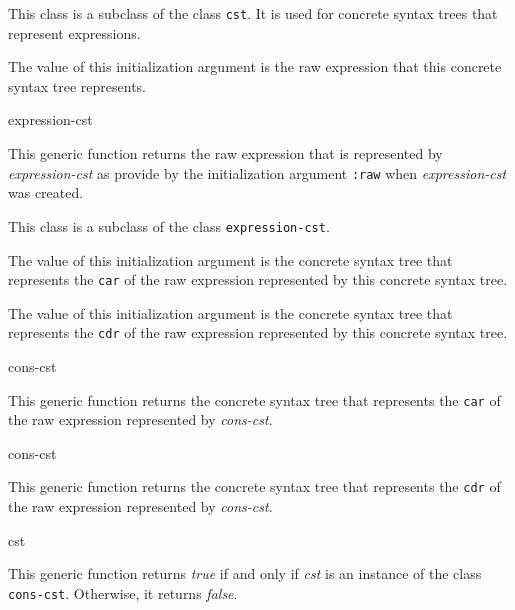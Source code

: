 This class is a subclass of the class \texttt{cst}.  It is used for
concrete syntax trees that represent \commonlisp{} expressions.


The value of this initialization argument is the raw \commonlisp{}
expression that this concrete syntax tree represents.

 {expression-cst}

This generic function returns the raw \commonlisp{} expression that is
represented by \textit{expression-cst} as provide by the
initialization argument \texttt{:raw} when \textit{expression-cst} was
created.


This class is a subclass of the class \texttt{expression-cst}.


The value of this initialization argument is the concrete syntax tree
that represents the \texttt{car} of the raw \commonlisp{} expression
represented by this concrete syntax tree.


The value of this initialization argument is the concrete syntax tree
that represents the \texttt{cdr} of the raw \commonlisp{} expression
represented by this concrete syntax tree.

 {cons-cst}

This generic function returns the concrete syntax tree that represents
the \texttt{car} of the raw \commonlisp{} expression represented by
\textit{cons-cst}.

 {cons-cst}

This generic function returns the concrete syntax tree that represents
the \texttt{cdr} of the raw \commonlisp{} expression represented by
\textit{cons-cst}.

 {cst}

This generic function returns \emph{true} if and only if \textit{cst}
is an instance of the class \texttt{cons-cst}.  Otherwise, it returns
\emph{false}.
